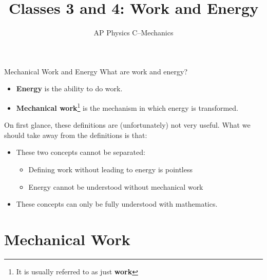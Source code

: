 \documentclass[12pt,compress,aspectratio=169]{beamer}
\title{Classes 3 and 4: Work and Energy}
\subtitle{AP Physics C--Mechanics}
\begin{document}
\begin{frame}
  \maketitle
\end{frame}



\begin{frame}{Mechanical Work and Energy}
  What are work and energy?
  \begin{itemize}
  \item\textbf{Energy} is the ability to do work.
  \item\textbf{Mechanical work}\footnote{It is usually referred to as just
  \textbf{work}} is the mechanism in which energy is transformed.
  \end{itemize}
  On first glance, these definitions are (unfortunately) not very useful. What
  we should take away from the definitions is that:
  \begin{itemize}
  \item These two concepts cannot be separated:
    \begin{itemize}
    \item Defining work without leading to energy is pointless
    \item Energy cannot be understood without mechanical work
    \end{itemize}
  \item These concepts can only be fully understood with mathematics.
  \end{itemize}
\end{frame}


\section{Mechanical Work}
\end{document}
